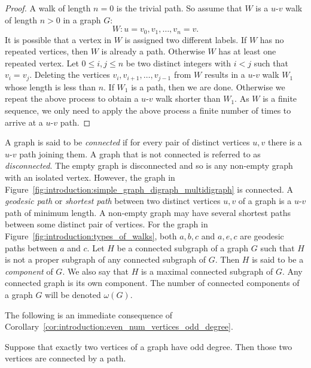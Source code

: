 \begin{proof}
A walk of length $n = 0$ is the trivial path. So assume that $W$ is a
$u$-$v$ walk of length $n > 0$ in a graph $G$:
\[
W: u = v_0, v_1, \dots, v_n = v.
\]
It is possible that a vertex in $W$ is assigned two different
labels. If $W$ has no repeated vertices, then $W$ is already a
path. Otherwise $W$ has at least one repeated vertex. Let
$0 \leq i,j \leq n$ be two distinct integers with $i < j$ such that
$v_i = v_j$. Deleting the vertices $v_i, v_{i+1}, \dots, v_{j-1}$ from
$W$ results in a $u$-$v$ walk $W_1$ whose length is less than $n$. If
$W_1$ is a path, then we are done. Otherwise we repeat the above
process to obtain a $u$-$v$ walk shorter than $W_1$. As $W$ is a
finite sequence, we only need to apply the above process a finite
number of times to arrive at a $u$-$v$ path.
\end{proof}

A graph is said to be
\emph{connected} if for
every pair of distinct vertices $u, v$ there is a $u$-$v$ path joining
them. A graph that is not connected is referred to as
\emph{disconnected}.
The empty graph is disconnected and so is any non-empty graph with an
isolated vertex. However, the graph in
Figure~\ref{fig:introduction:simple_graph_digraph_multidigraph} is
connected. A \emph{geodesic path} or
\emph{shortest path} between two distinct
vertices $u,v$ of a graph is a $u$-$v$ path of minimum length. A
non-empty graph may have several shortest paths between some distinct
pair of vertices. For the graph in
Figure~\ref{fig:introduction:types_of_walks}, both $a,b,c$ and $a,e,c$
are geodesic paths between $a$ and $c$. Let $H$ be a connected
subgraph of a graph $G$ such that $H$ is not a proper subgraph of any
connected subgraph of $G$. Then $H$ is said to be a
\emph{component} of $G$. We also say that $H$ is a
maximal connected subgraph of $G$. Any connected graph is its own
component. The number of connected components of a graph $G$ will be
denoted $\omega(G)$\index{$\omega$}.

The following is an immediate consequence of
Corollary~\ref{cor:introduction:even_num_vertices_odd_degree}.

\begin{proposition}
Suppose that exactly two vertices of a graph have odd degree. Then
those two vertices are connected by a path.
\end{proposition}

